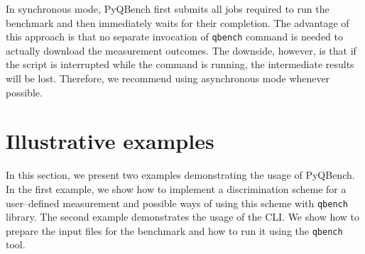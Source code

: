 \documentclass[preprint,12pt, a4paper, dvipsnames]{elsarticle}
\newcommand{\1}{{\rm 1\hspace{-0.9mm}l}}
\theoremstyle{definition}
\begin{document}
In synchronous mode, PyQBench first submits all jobs required to run the benchmark and then
immediately waits for their completion. The advantage of this approach is that no separate
invocation of \texttt{qbench} command is needed to actually download the measurement outcomes. The
downside, however, is that if the script is interrupted while the command is running, the
intermediate results will be lost. Therefore, we recommend using asynchronous mode
whenever possible.

\section{Illustrative examples}
\label{sec:examples}
In this section, we present two examples demonstrating the usage of PyQBench. In the first example,
we show how to implement a discrimination scheme for a user--defined measurement and possible ways
of using this scheme with \texttt{qbench} library. The second example demonstrates the usage of the
CLI. We show how to prepare the input files for the benchmark and how to run it using the
\texttt{qbench} tool.
\end{document}
